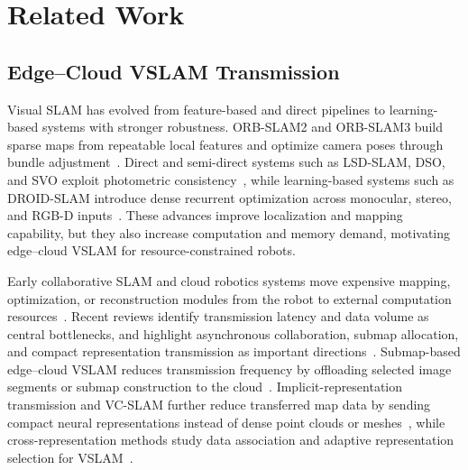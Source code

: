 
\section{Related Work}
\label{sec:related_work}


\subsection{Edge--Cloud VSLAM Transmission}
\label{subsec:edge_cloud_transmission}

Visual SLAM has evolved from feature-based and direct pipelines to learning-based systems with stronger robustness. ORB-SLAM2 and ORB-SLAM3 build sparse maps from repeatable local features and optimize camera poses through bundle adjustment~\cite{murartal2017orbslam2,campos2021orbslam3}. Direct and semi-direct systems such as LSD-SLAM, DSO, and SVO exploit photometric consistency~\cite{engel2014lsdslam,engel2018dso,forster2014svo}, while learning-based systems such as DROID-SLAM introduce dense recurrent optimization across monocular, stereo, and RGB-D inputs~\cite{teed2021droidslam}. These advances improve localization and mapping capability, but they also increase computation and memory demand, motivating edge--cloud VSLAM for resource-constrained robots.

Early collaborative SLAM and cloud robotics systems move expensive mapping, optimization, or reconstruction modules from the robot to external computation resources~\cite{rabaud2011c2tam,kuffner2010cloud,shankar2020fogros}. Recent reviews identify transmission latency and data volume as central bottlenecks, and highlight asynchronous collaboration, submap allocation, and compact representation transmission as important directions~\cite{chen2024reviewcloudedge}. Submap-based edge--cloud VSLAM reduces transmission frequency by offloading selected image segments or submap construction to the cloud~\cite{chen2024cloudlearning,chen2024implicittransmission}. Implicit-representation transmission and VC-SLAM further reduce transferred map data by sending compact neural representations instead of dense point clouds or meshes~\cite{chen2024implicittransmission,huo2025vcslam}, while cross-representation methods study data association and adaptive representation selection for VSLAM~\cite{chen2024crossdata,chen2025xrepslam}.

